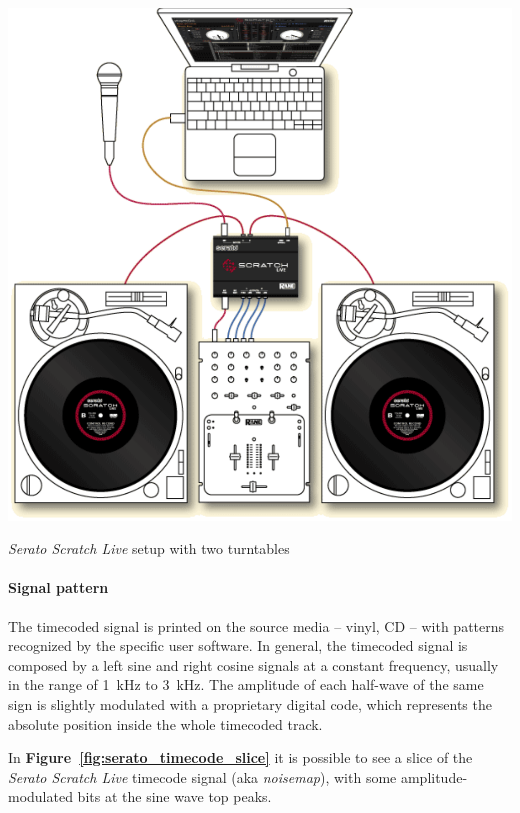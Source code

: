 \documentclass[a4paper,10pt]{article}
\makeatletter
\newenvironment{figurehere}{\def\@captype{figure}\vspace{2ex}}{\vspace{2ex}}
\newcommand{\citef}[1]{\textbf{Figure~\ref{#1}}}
\makeatother
\begin{document}
\begin{multicols}{2}
\begin{figurehere}
	\centering
	\includegraphics[keepaspectratio=true,width=0.9\columnwidth]{images/serato_setup.pdf}
	\caption{\emph{Serato Scratch Live} setup with two turntables}
	\label{fig:serato_setup}
\end{figurehere}


\paragraph{Signal pattern}
The timecoded signal is printed on the source media -- vinyl, CD -- with
patterns recognized by the specific user software. In general, the timecoded
signal is composed by a left sine and right cosine signals at a constant
frequency, usually in the range of 1~kHz to 3~kHz. The amplitude of each
half-wave of the same sign is slightly modulated with a proprietary digital
code, which represents the absolute position inside the whole timecoded track.

In \citef{fig:serato_timecode_slice} it is possible to see a slice of the
\emph{Serato Scratch Live} \cite{rane_ssl} timecode signal (aka
\emph{noisemap}), with some amplitude-modulated bits at the sine wave top
peaks.


\end{multicols}
\end{document}
